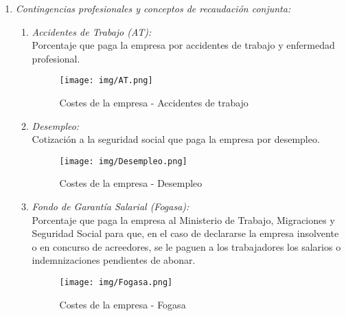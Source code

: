 \begin{itemize}
\begin{enumerate}
        \item\textit {Contingencias profesionales y conceptos de recaudación conjunta:}\\
        \begin{enumerate}
            \item\textit {Accidentes de Trabajo (AT):}\\
            Porcentaje que paga la empresa por accidentes de trabajo y enfermedad profesional.\\
            \begin{figure}[h]
              \begin{minipage}{1.3\textwidth}
                \centering
                \texttt{[image: img/AT.png]} \\
                \caption{Costes de la empresa - Accidentes de trabajo}
                \label{Costes de la empresa - Accidentes de trabajo}
               \end{minipage}
            \end{figure}
            
            \item\textit {Desempleo:}\\
            Cotización a la seguridad social que paga la empresa por desempleo.\\
            \begin{figure}[h]
              \begin{minipage}{1.3\textwidth}
                \centering
                \texttt{[image: img/Desempleo.png]} \\
                \caption{Costes de la empresa - Desempleo}
                \label{Costes de la empresa - Desempleo}
               \end{minipage}
            \end{figure}
            
            \item\textit {Fondo de Garantía Salarial (Fogasa):}\\
            Porcentaje que paga la empresa al Ministerio de Trabajo, Migraciones y Seguridad Social para que, en el caso de declararse la empresa insolvente o en concurso de acreedores, se le paguen a los trabajadores los salarios o indemnizaciones pendientes de abonar.\\
            \begin{figure}[ht]
              \begin{minipage}{1.2\textwidth}
                \centering
                \texttt{[image: img/Fogasa.png]} \\
                \caption{Costes de la empresa - Fogasa}
                \label{Costes de la empresa - Fogasa}
               \end{minipage}
            \end{figure}
            

\end{enumerate}
\end{enumerate}
\end{itemize}
